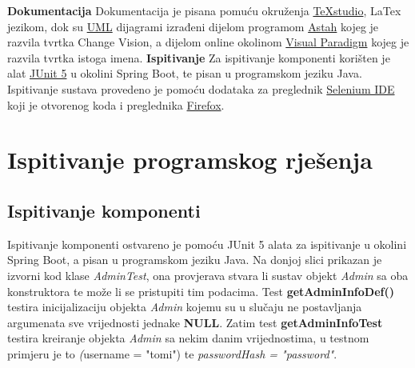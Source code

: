 			 \newline \textbf{Dokumentacija} \newline
			 Dokumentacija je pisana pomuću okruženja \href{https://www.texstudio.org/}{TeXstudio}, LaTex jezikom, dok su \href{https://www.uml-diagrams.org/}{UML} dijagrami izrađeni dijelom programom \href{https://astah.net/}{Astah} kojeg je razvila tvrtka Change Vision, a dijelom online okolinom \href{https://www.visual-paradigm.com/}{Visual Paradigm} kojeg je razvila tvrtka istoga imena.
			 \newline \textbf{Ispitivanje} \newline
			 Za ispitivanje komponenti korišten je alat \href{https://junit.org/junit5/}{JUnit 5} u okolini Spring Boot, te pisan u programskom jeziku Java. Ispitivanje sustava provedeno je pomoću dodataka za preglednik \href{https://www.selenium.dev/selenium-ide/}{Selenium IDE} koji je otvorenog koda i preglednika \href{https://www.mozilla.org/en-US/firefox/new/}{Firefox}.
			 
			\eject 
		
		\section{Ispitivanje programskog rješenja}
			
			
	
			
			\subsection{Ispitivanje komponenti}
			
			Ispitivanje komponenti ostvareno je pomoću JUnit 5 alata za ispitivanje u okolini Spring Boot, a pisan u programskom jeziku Java. \newline
			Na donjoj slici prikazan je izvorni kod klase \textit{AdminTest}, ona provjerava stvara li sustav objekt \textit{Admin} sa oba konstruktora te može li se pristupiti tim podacima. Test \textbf{getAdminInfoDef()} testira inicijalizaciju objekta \textit{Admin} kojemu su u slučaju ne postavljanja argumenata sve vrijednosti jednake \textbf{NULL}. Zatim test \textbf{getAdminInfoTest} testira kreiranje objekta \textit{Admin} sa nekim danim vrijednostima, u testnom primjeru je to \textit(username = "tomi") te \textit{passwordHash = "password"}. 
			
